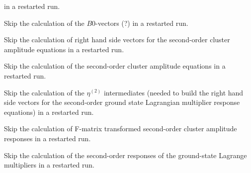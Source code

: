 \begin{description}
   in a restarted run.
%
\item[\Key{B0SKIP}] 
   Skip the calculation of the $B0$-vectors (?)
   in a restarted run.
%
\item[\Key{O2SKIP}] 
   Skip the calculation of right hand side vectors for the 
   second-order cluster amplitude equations
   in a restarted run.
%
\item[\Key{R2SKIP}] 
   Skip the calculation of the 
   second-order cluster amplitude equations
   in a restarted run.
%
\item[\Key{X2SKIP}] 
   Skip the calculation of the $\eta^{(2)}$ intermediates (needed
   to build the right hand side vectors for the second-order 
   ground state Lagrangian multiplier response equations) 
   in a restarted run.
%
\item[\Key{F2SKIP}] 
   Skip the calculation of F-matrix transformed second-order
   cluster amplitude responses in a restarted run.
%
\item[\Key{L2SKIP}]  
   Skip the calculation of the second-order responses of the 
   ground-state Lagrange multipliers in a restarted run.
\end{description}

